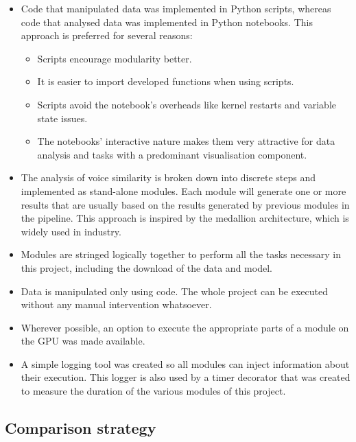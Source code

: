 \documentclass[conference]{IEEEtran}
\begin{document}
	\begin{itemize}
		\item Code that manipulated data was implemented in Python scripts, whereas code that analysed data was implemented in Python notebooks. This approach is preferred for several reasons:
		
		\begin{itemize}
			\item Scripts encourage modularity better.
			\item It is easier to import developed functions when using scripts.
			\item Scripts avoid the notebook's overheads like kernel restarts and variable state issues.
			\item The notebooks' interactive nature makes them very attractive for data analysis and tasks with a predominant visualisation component.
		\end{itemize}
		
		\item The analysis of voice similarity is broken down into discrete steps and implemented as stand-alone modules.    Each module will generate one or more results that are usually based on the results generated by previous modules in the pipeline. This approach is inspired by the medallion architecture, which is widely used in industry.
		\item Modules are stringed logically together to perform all the tasks necessary in this project, including the download of the data and model.
		\item Data is manipulated only using code. The whole project can be executed without any manual intervention whatsoever.
		\item Wherever possible, an option to execute the appropriate parts of a module on the GPU was made available.
		\item A simple logging tool was created so all modules can inject information about their execution. This logger is also used by a timer decorator that was created to measure the duration of the various modules of this project.
	\end{itemize}
	
	\subsection{Comparison strategy}
	\label{ssec:comparison-strategy}
	
\end{document}
